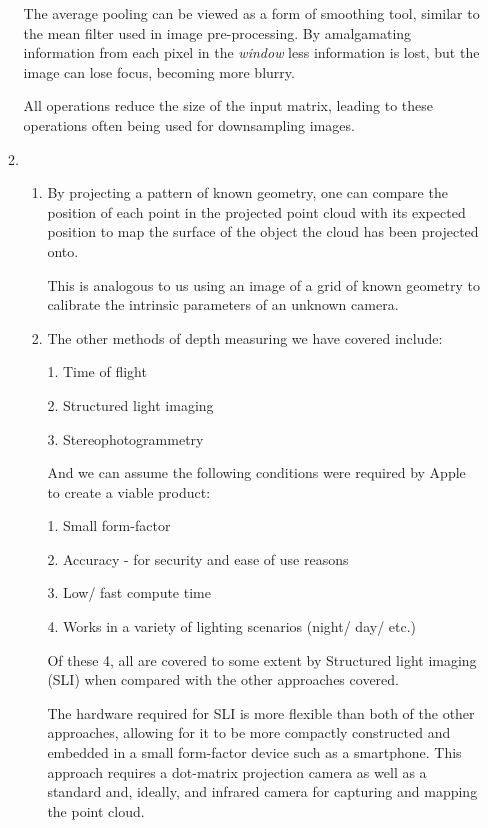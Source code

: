 \documentclass[12pt,a4paper]{article}
\begin{document}
\begin{enumerate}
\begin{enumerate}
                        The average pooling can be viewed as a form of smoothing tool, similar to the mean filter used in image pre-processing. By amalgamating information from each pixel in the \textit{window} less information is lost, but the image can lose focus, becoming more blurry.

                        All operations reduce the size of the input matrix, leading to these operations often being used for downsampling images.


                  \item

                        \begin{enumerate}

                          \item By projecting a pattern of known geometry, one can compare the position of each point in the projected point cloud with its expected position to map the surface of the object the cloud has been projected onto.

                                This is analogous to us using an image of a grid of known geometry to calibrate the intrinsic parameters of an unknown camera.

                          \item The other methods of depth measuring we have covered include:

                                1. Time of flight

                                2. Structured light imaging

                                3. Stereophotogrammetry

                                And we can assume the following conditions were required by Apple to create a viable product:

                                1. Small form-factor

                                2. Accuracy - for security and ease of use reasons

                                3. Low/ fast compute time

                                4. Works in a variety of lighting scenarios (night/ day/ etc.)


                                Of these 4, all are covered to some extent by Structured light imaging (SLI) when compared with the other approaches covered.

                                The hardware required for SLI is more flexible than both of the other approaches, allowing for it to be more compactly constructed and embedded in a small form-factor device such as a smartphone. This approach requires a dot-matrix projection camera as well as a standard and, ideally, and infrared camera for capturing and mapping the point cloud.


\end{enumerate}
\end{enumerate}
\end{enumerate}
\end{document}
